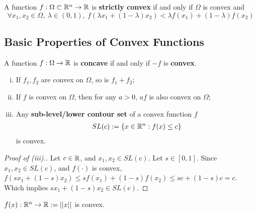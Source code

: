 \documentclass{article}
\begin{document}
    \begin{definition}
        A function $f: \Omega \subset \mathbb{R}^n \to \mathbb{R}$ is \textbf{strictly convex} if and only if $\Omega$ is convex and 
        \begin{equation}
            \forall x_1, x_2 \in \Omega,\ \lambda \in (0, 1),\ f\left(\lambda x_1 + (1- \lambda) x_2 \right) < \lambda f(x_1) + (1 - \lambda) f(x_2)
        \end{equation}
    \end{definition}
    
    \subsection{Basic Properties of Convex Functions}
    
    \begin{definition}
        A function $f: \Omega \to \mathbb{R}$ is \textbf{concave} if and only if $-f$ is \textbf{convex}.
    \end{definition}
    
    \begin{proposition}
        \begin{enumerate}[(i)]
            \item If $f_1, f_2$ are convex on $\Omega$, so is $f_1 + f_2$;
            \item If $f$ is convex on $\Omega$, then for any $a > 0$, $af$ is also convex on $\Omega$;
            \item Any \textbf{sub-level/lower contour set} of a convex function $f$ 
            \begin{align}
            	SL(c) := \{x \in \mathbb{R}^n: f(x) \leq c\}
            \end{align}
            is convex.
        \end{enumerate}
    \end{proposition}
    
    \begin{proof}[Proof of (iii).]
    	Let $c \in \mathbb{R}$, and $x_1 ,x_2 \in SL(c)$. Let $s \in [0, 1]$. Since $x_1, x_2 \in SL(c)$, and $f(\cdot)$ is convex, $f(s x_1 + (1-s) x_2) \leq s f(x_1) + (1-s) f(x_2) \leq s c + (1-s) c = c$. Which implies $s x_1 + (1-s) x_2 \in SL(c)$.
    \end{proof}
    
    \begin{example}
    	$f(x): \mathbb{R}^n \to \mathbb{R} := \vert \vert {x} \vert \vert$ is convex.
    \end{example}
    
\end{document}
